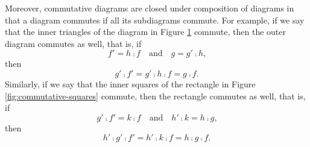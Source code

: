 \begin{remark}



  \label{re:commutative-diagram}

  Moreover, commutative diagrams are closed under composition of
  diagrams in that a diagram commutes if all its subdiagrams commute.
  For example, if we say that the inner triangles of the diagram in
  Figure \ref{fig:commutative-triangles} commute, then the outer
  diagram commutes as well, that is, if
  \begin{equation*}
    f' = h \comp f
    \quad
    \text{and}
    \quad
    g = g' \comp h
    \text{,}
  \end{equation*}
  then
  \begin{equation*}
    g' \comp f' = g' \comp h \comp f = g \comp f
    \text{.}
  \end{equation*}
  Similarly, if we say that the inner squares of the rectangle in
  Figure \ref{fig:commutative-squares} commute, then the rectangle
  commutes as well, that is, if
  \begin{equation*}
    g' \comp f' = k \comp f
    \quad
    \text{and}
    \quad
    h' \comp k = h \comp g
    \text{,}
  \end{equation*}
  then
  \begin{equation*}
    h' \comp g' \comp f' = h' \comp k \comp f = h \comp g \comp f
    \text{.}
  \end{equation*}

  \begin{figure}[htbp]
    \begin{subfigure}{0.5\linewidth}
      \begin{center}
      \end{center}
      \caption{}
      \label{fig:commutative-triangles}
    \end{subfigure}
    \begin{subfigure}{0.5\linewidth}
      \begin{center}
\end{center}
\end{subfigure}
\end{figure}
\end{remark}
